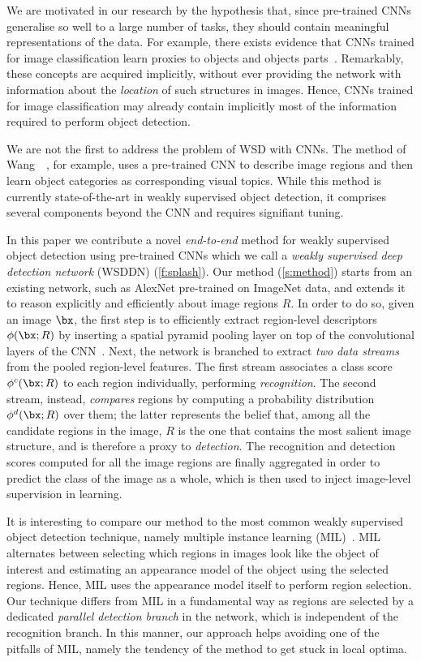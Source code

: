 We are motivated in our research by the hypothesis that, since pre-trained CNNs generalise so well to a large number of tasks, they should contain meaningful representations of the data. For example, there exists evidence that CNNs trained for image classification learn proxies to objects and objects parts~\cite{Zhou15}. Remarkably, these concepts are acquired implicitly, without ever providing the network with information about the \emph{location} of such structures in images. Hence, CNNs trained for image classification may already contain implicitly most of the information required to perform object detection.

We are not the first to address the problem of WSD with CNNs. The method of Wang~\etal~\cite{Wang14a}, for example, uses a pre-trained CNN to describe image regions and then learn object categories as corresponding visual topics. While this method is currently state-of-the-art in weakly supervised object detection, it comprises several components beyond the CNN and requires signifiant tuning. 

In this paper we contribute a novel {\em end-to-end} method for weakly supervised object detection using pre-trained CNNs which we call a \emph{weakly supervised deep detection network} (WSDDN) (\cref{f:splash}). Our method (\cref{s:method}) starts from an existing network, such as AlexNet pre-trained on ImageNet data, and extends it to reason explicitly and efficiently about image regions $R$. In order to do so, given an image $\bx$, the first step is to efficiently extract region-level descriptors $\phi(\bx;R)$ by inserting a spatial pyramid pooling layer on top of the convolutional layers of the CNN~\cite{He14,Girshick15}. Next,  the network is branched to extract \emph{two data streams} from the pooled region-level features. The first stream associates a class score $\phi^c(\bx;R)$ to each region individually, performing \emph{recognition}.  The second stream, instead, \emph{compares} regions by computing a probability distribution $\phi^d(\bx;R)$ over them; the latter represents the belief that, among all the candidate regions in the image,  $R$ is the one that contains the most salient image structure, and is therefore a proxy to \emph{detection}. The recognition and detection scores computed for all the image regions are finally aggregated in order to predict the class of the image as a whole, which is then used to inject image-level supervision in learning.

It is interesting to compare our method to the most common weakly supervised object detection technique, namely multiple instance learning (MIL)~\cite{Dietterich97}. MIL alternates between selecting which regions in images look like  the object of interest and estimating an appearance model of the object using the selected regions. Hence, MIL uses the appearance model itself to perform region selection. Our technique differs from MIL in a fundamental way as regions are selected by a dedicated \emph{parallel detection branch} in the network, which is independent of the recognition branch. In this manner, our approach helps avoiding one of the pitfalls of MIL, namely the tendency of the method to get stuck in local optima. 

